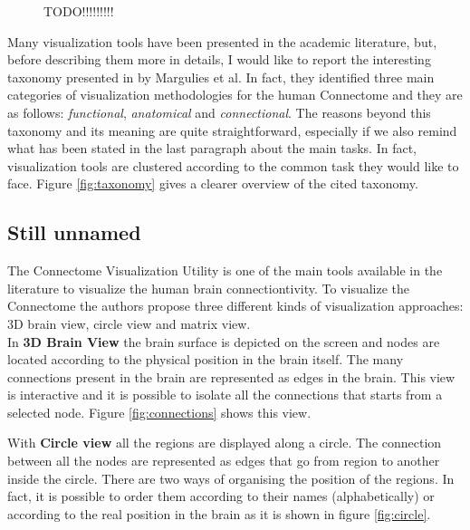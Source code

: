 \documentclass{article}
\begin{document}
\begin{multicols}{2}
\begin{figure}[ht]
	\caption{TODO!!!!!!!!!}
\end{figure}

Many visualization tools have been presented in the academic literature, but, before describing them more in details, I would like to report the interesting taxonomy presented in \cite{visualizingHumanConnectome} by Margulies et al. In fact, they identified three main categories of visualization methodologies for the human Connectome and they are as follows: \textit{functional}, \textit{anatomical} and \textit{connectional}. The reasons beyond this taxonomy and its meaning are quite straightforward, especially if we also remind what has been stated in the last paragraph about the main tasks. In fact, visualization tools are clustered according to the common task they would like to face. Figure \ref{fig:taxonomy} gives a clearer overview of the cited taxonomy. 






\subsection{Still unnamed}
The Connectome Visualization Utility \cite{connectomeVisualizationUtility} is one of the main tools available in the literature to visualize the human brain connectiontivity. To visualize the Connectome the authors propose three different kinds of visualization approaches: 3D brain view, circle view and matrix view.\\
In \textbf{3D Brain View} the brain surface is depicted on the screen and nodes are located according to the physical position in the brain itself. The many connections present in the brain are represented as edges in the brain. This view is interactive and it is possible to isolate all the connections that starts from a selected node. Figure \ref{fig:connections} shows this view.



With \textbf{Circle view} all the regions are displayed along a circle. The connection between all the nodes are represented as edges that go from region to another inside the circle. There are two ways of organising the position of the regions. In fact, it is possible to order them according to their names (alphabetically) or according to the real position in the brain as it is shown in figure \ref{fig:circle}.


\end{multicols}
\end{document}
